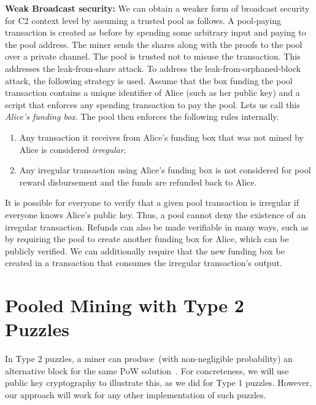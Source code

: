 \documentclass{llncs}
\begin{document}
\textbf{Weak Broadcast security:} We can obtain a weaker form of broadcast security for C2 context level by assuming a trusted pool as follows. A pool-paying transaction is created as before by spending some arbitrary input and paying to the pool address. The miner sends the shares along with the proofs to the pool over a private channel. The pool is trusted not to misuse the transaction. This addresses the leak-from-share attack. To address the leak-from-orphaned-block attack, the following strategy is used. Assume that the box funding the pool transaction contains a unique identifier of Alice (such as her public key) and a script that enforces any spending transaction to pay the pool. Lets us call this {\em Alice's funding box}. The pool then enforces the following rules internally.
\begin{enumerate}
    \item Any transaction it receives from Alice's funding box that was not mined by Alice is considered {\em irregular}.
    \item Any irregular transaction using Alice's funding box is not considered for pool reward disbursement and the funds are refunded back to Alice.
\end{enumerate}
It is possible for everyone to verify that a given pool transaction is irregular if everyone knows Alice's public key. Thus, a pool cannot deny the existence of an irregular transaction. Refunds can also be made verifiable in many ways, such as by requiring the pool to create another funding box for Alice, which can be publicly verified. We can additionally require that the new funding box be created in a transaction that consumes the irregular transaction's output. 


\section{Pooled Mining with Type 2 Puzzles}
\label{bypasstype2}

In Type 2 puzzles, a miner can produce~(with non-negligible probability) an alternative block for the same PoW solution~\cite{miller2015nonoutsourceable}.
For concreteness, we will use public key cryptography to illustrate this, as we did for Type 1 puzzles. However, our approach will work for any other implementation of such puzzles.
\end{document}

